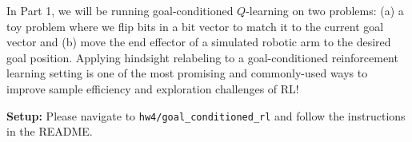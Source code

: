 \documentclass[12pt]{article}
\begin{document}
In Part 1, we will be running goal-conditioned $Q$-learning on two problems: (a) a toy problem where we flip bits in a bit vector to match it to the current goal vector and (b) move the end effector of a simulated robotic arm to the desired goal position. Applying hindsight relabeling to a goal-conditioned reinforcement learning setting is one of the most promising and commonly-used ways to improve sample efficiency and exploration challenges of RL!

\textbf{Setup:} Please navigate to \texttt{hw4/goal\_conditioned\_rl} and follow the instructions in the README. 

\end{document}
